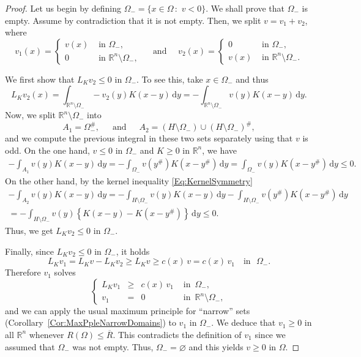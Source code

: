 \documentclass[12pt,reqno]{amsart}
\theoremstyle{definition}
\theoremstyle{remark}
\newcommand{\con}[1]{\mathbb{#1}}
\newcommand{\R}{\con{R}} %
\renewcommand{\d}{\,\mathrm{d}} %
\newcommand\beqc[1]{\left\{\begin{array}{#1}}
\newcommand\eeqc{\end{array} \right.}
\def\PDEsystem{rcll}
\numberwithin{equation}{section}
\begin{document}
\begin{proof}
	Let us begin by defining $\Omega_- = \{x\in \Omega \,:\,\, v<0\}$. We shall prove that $\Omega_-$ is empty. Assume by contradiction that it is not empty. Then, we split $ v = v_1+v_2$, where
	\begin{equation*}
	v_1(x) =
	\begin{cases}
	v(x)  &\textrm{ in } \Omega_-,\\
	0 &\textrm{ in } \R^n\setminus\Omega_-,
	\end{cases}
	\quad \text{ and } \quad
	v_2(x) =
	\begin{cases}
	0  &\textrm{ in } \Omega_-,\\
	v(x) &\textrm{ in } \R^n\setminus\Omega_-.
	\end{cases}
	\end{equation*}
	
	We first show that $L_K v_2\leq 0$ in $\Omega_-$. To see this, take $x\in\Omega_-$ and thus
	$$
	L_K v_2(x) = \int_{\R^n\setminus\Omega_-} -v_2(y)K(x-y) \d y = -\int_{\R^n\setminus\Omega_-} v(y)K(x-y) \d y.
	$$
	Now, we split $\R^n\setminus\Omega_-$ into
	$$
	A_1 = \Omega_-^\#,\,\,\,\,\,\,\,\text{ and }\,\,\,\,\,\,\, A_2 = \left(H\setminus\Omega_-\right)\cup\left(H\setminus\Omega_-\right)^\#,
	$$
	and we compute the previous integral in these two sets separately using that $v$ is odd. On the one hand, $v\leq 0$ in $\Omega_-$ and $K\geq 0$ in $\R^n$, we have
	\begin{align*}
	-\int_{A_1} v(y)K(x-y) \d y = -\int_{\Omega_-} v(y^\#)K(x-y^\#) \d y  = \int_{\Omega_-} v(y)K(x-y^\#) \d y \leq 0.
	\end{align*}
	On the other hand, by the kernel inequality \eqref{Eq:KernelSymmetry}
	\begin{align*}
	-\int_{A_2} v(y)K(x-y) \d y = -\int_{H\setminus\Omega_-} v(y)K(x-y) \d y  -\int_{H\setminus\Omega_-} v(y^\#)K(x-y^\#) \d y \\
	= -\int_{H\setminus\Omega_-} v(y)\left\{K(x-y)-K(x-y^\#)\right\} \d y \leq 0.
	\end{align*}
	Thus, we get $L_K v_2 \leq 0$ in $\Omega_-$.
	
	Finally, since $L_K v_2 \leq 0$ in $\Omega_-$, it holds
	$$ 
	L_K v_1 = L_K v-L_K v_2 \geq L_K v \geq c(x)\,v = c(x)\,v_1 \,\,\,\,\text{ in }\,\,\Omega_-. 
	$$
	Therefore $v_1$ solves
	\begin{equation*}
	\beqc{\PDEsystem}
	L_K v_1 &\geq& c(x)\,v_1   &\textrm{ in } \,\Omega_-,\\
	v_1 &=& 0 &\textrm{ in }\,\R^n\setminus\Omega_-,
	\eeqc
	\end{equation*}
	and we can apply the usual maximum principle for ``narrow'' sets (Corollary~\ref{Cor:MaxPpleNarrowDomains}) to $v_1$ in $\Omega_-$.  We deduce that $v_1\geq 0$ in all $\R^n$ whenever $R(\Omega)\leq \overline{R}$. This contradicts the definition of $v_1$ since we assumed that $\Omega_-$ was not empty. Thus, $\Omega_- = \varnothing$ and this yields $v\geq 0$ in $\Omega$.
\end{proof}
\end{document}
